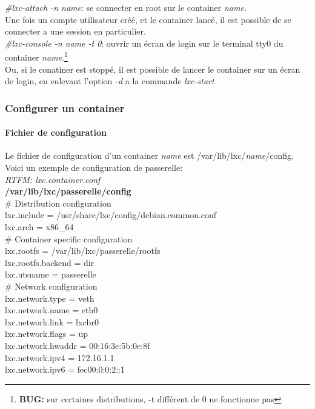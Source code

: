 \emph{\#lxc-attach -n name}: se connecter en root sur le container \emph{name}.\\
Une fois un compte utilisateur cr\'e\'e, et le container lanc\'e, il est possible de se connecter a une session en particulier.\\

\emph{\#lxc-console -n name -t 0}: ouvrir un \'ecran de login sur le terminal tty0 du container \emph{name}.\footnote{\textbf{BUG:} sur certaines distributions, -t diff\'erent de 0 ne fonctionne pas}\\
Ou, si le conatiner est stopp\'e, il est possible de lancer le container sur un \'ecran de login, en enlevant l'option \emph{-d} a la commande \emph{lxc-start}

\subsubsection{Configurer un container}
\paragraph{Fichier de configuration}
Le fichier de configuration d'un container \emph{name} est /var/lib/lxc/\emph{name}/config. Voici un exemple de configuration de passerelle:\\
\emph{RTFM: lxc.container.conf}\\

\noindent
\textbf{/var/lib/lxc/passerelle/config}\\

\noindent
\# Distribution configuration\\
lxc.include = /usr/share/lxc/config/debian.common.conf\\
lxc.arch = x86\_64\\

\noindent
\# Container specific configuration\\
lxc.rootfs = /var/lib/lxc/passerelle/rootfs\\
lxc.rootfs.backend = dir\\
lxc.utsname = passerelle\\

\noindent
\# Network configuration\\
lxc.network.type = veth\\
lxc.network.name = eth0\\
lxc.network.link = lxcbr0\\
lxc.network.flags = up\\
lxc.network.hwaddr = 00:16:3e:5b:0e:8f\\
lxc.network.ipv4 = 172.16.1.1\\
lxc.network.ipv6 = fec00:0:0:2::1\\

